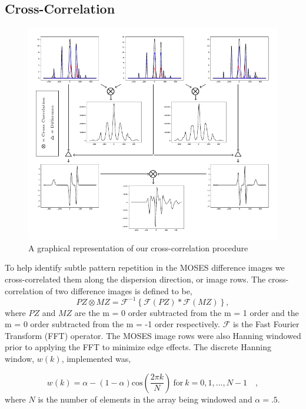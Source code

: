 \documentclass[]{solarphysics}
\begin{document}
\begin{article}
 	
 	\subsection{Cross-Correlation}
 	
 	 	
 	 	\begin{figure}
 	 		\includegraphics[scale = 1]{methods_fig.pdf}
 	 		\caption{A graphical representation of our cross-correlation procedure}
 	 		\label{fig:methods}
 	 	\end{figure}
	
 	To help identify subtle pattern repetition in the MOSES difference images we cross-correlated them along the dispersion direction, or image rows.  The cross-correlation of two difference images is defined to be,
	 	\begin{equation}
		 	PZ \otimes MZ = \mathcal{F}^{-1} \left\{\mathcal{F}\left(PZ \right)*\mathcal{F}\left(MZ \right)  \right\},
		 	\label{eqn:cross_correlate}
	 	\end{equation}
 	where $PZ$ and $MZ$ are the m = 0 order subtracted from the m = 1 order and the m = 0 order subtracted from the m = -1 order respectively. $\mathcal{F}$ is the Fast Fourier Transform (FFT) operator.  The MOSES image rows were also Hanning windowed prior to applying the FFT to minimize edge effects.  The discrete Hanning window, $w(k)$, implemented was,
 	
		\begin{equation}
			w(k) = \alpha - (1-\alpha)\mathrm{cos}\left( \frac{2\pi k}{N} \right) \ \mathrm{for} \ k = 0,1,...,N-1 \quad ,
			\label{eqn:Hanning}
		\end{equation}
	where $N$ is the number of elements in the array being windowed and $\alpha = .5$.
 	

\end{article}
\end{document}
